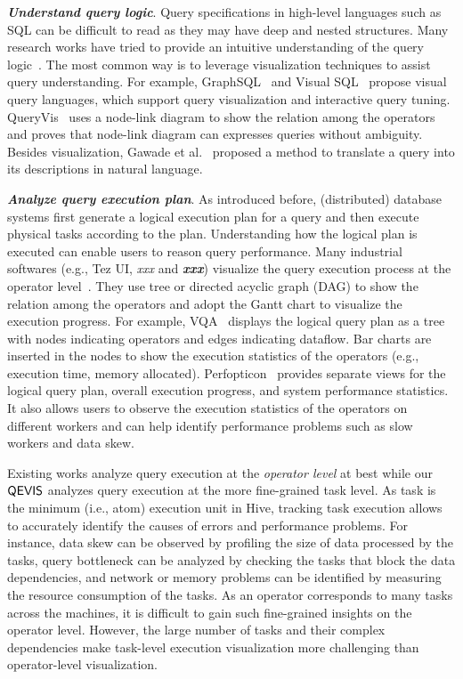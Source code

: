 \emph{\textbf{Understand query logic}}. Query specifications in high-level languages such as SQL can be difficult to read as they may have deep and nested structures. Many research works have tried to provide an intuitive understanding of the query logic~\cite{abouzied2012dataplay, gatterbauer2011databases, cerullo2007system,jaakkola2003visual,leventidis2020queryvis,danaparamita2011queryviz}. 
The most common way is to leverage visualization techniques to assist query understanding.
For example, GraphSQL~\cite{cerullo2007system} and Visual SQL~\cite{jaakkola2003visual} propose visual query languages, which support query visualization and interactive query tuning.
QueryVis~\cite{leventidis2020queryvis} uses a node-link diagram to show the relation among the operators and proves that node-link diagram can expresses queries without ambiguity. Besides visualization, Gawade et al.~\cite{koutrika2010explaining} proposed a method to translate a query into its descriptions in natural language. 

\emph{\textbf{Analyze query execution plan}}. As introduced before, (distributed) database systems first generate a logical execution plan for a query and then execute physical tasks according to the plan. Understanding how the logical plan is executed can enable users to reason query performance. Many industrial softwares (e.g., Tez UI, \textit{xxx} and \textit{\textbf{xxx}}) visualize the query execution process at the operator level~\cite{tez-ui}. They use tree or directed acyclic graph (DAG) to show the relation among the operators and adopt the Gantt chart to visualize the execution progress. For example, VQA~\cite{simitsis2014vqa} displays the logical query plan as a tree with nodes indicating operators and edges indicating dataflow. Bar charts are inserted in the nodes to show the execution statistics of the operators (e.g., execution time, memory allocated). Perfopticon~\cite{moritz2015perfopticon} provides separate views for the logical query plan, overall execution progress, and system performance statistics. It also allows users to observe the execution statistics of the operators on different workers and can help identify performance problems such as slow workers and data skew. 

Existing works analyze query execution at the \textit{operator level} at best while our $\mathsf{QEVIS}$ analyzes query execution at the more fine-grained task level. As task is the minimum (i.e., atom) execution unit in Hive, tracking task execution allows to accurately identify the causes of errors and performance problems. For instance, data skew can be observed by profiling the size of data processed by the tasks, query bottleneck can be analyzed by checking the tasks that block the data dependencies, and network or memory problems can be identified by measuring the resource consumption of the tasks. As an operator corresponds to many tasks across the machines, it is difficult to gain such fine-grained insights on the operator level. However, the large number of tasks and their complex dependencies make task-level execution visualization more challenging than operator-level visualization.


